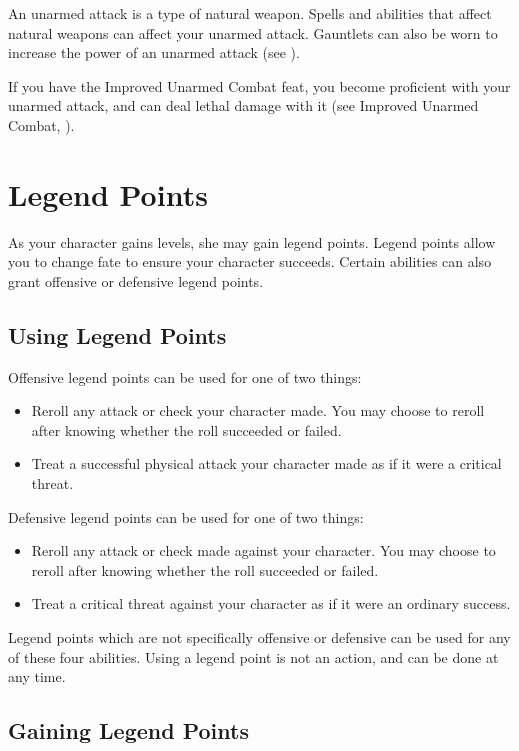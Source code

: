 An unarmed attack is a type of natural weapon. Spells and abilities that affect natural weapons can affect your unarmed attack. Gauntlets can also be worn to increase the power of an unarmed attack (see ).

If you have the Improved Unarmed Combat feat, you become proficient with your unarmed attack, and can deal lethal damage with it (see Improved Unarmed Combat, ).
\section{Legend Points}\label{Legend Points}

As your character gains levels, she may gain legend points. Legend points allow you to change fate to ensure your character succeeds. Certain abilities can also grant offensive or defensive legend points.

\subsection{Using Legend Points}

Offensive legend points can be used for one of two things:
\begin{itemize}
    \item Reroll any attack or check your character made. You may choose to reroll after knowing whether the roll succeeded or failed.
    \item Treat a successful physical attack your character made as if it were a critical threat.
\end{itemize}

Defensive legend points can be used for one of two things:
\begin{itemize}
    \item Reroll any attack or check made against your character. You may choose to reroll after knowing whether the roll succeeded or failed.
    \item Treat a critical threat against your character as if it were an ordinary success.
\end{itemize}

Legend points which are not specifically offensive or defensive can be used for any of these four abilities. Using a legend point is not an action, and can be done at any time.

\subsection{Gaining Legend Points}

